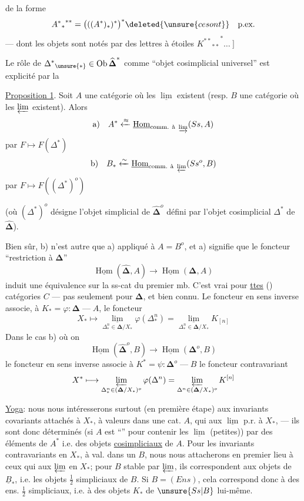 de la forme
\[
 {{A^*}_*}^{**}=\bigl(( (A^*)_* )^*\bigr)^*
 \deleted{\unsure{ce sont}}\quad\text{p.ex.}
\]
--- dont les objets sont notés par des lettres à étoiles
$ {{K^{**}}_{**}}^*\ldots\ \Big]$

Le rôle de ${\Delta^*}_{\unsure{*}}\in\operatorname{Ob}\widehat{\boldsymbol\Delta}^{*}$
comme ``objet cosimplicial universel'' est explicité par la

\uline{Proposition 1}. Soit $A$ une catégorie où les $\underline{\lim}$ existent
(resp. $B$ une catégorie où les $\varprojlim$ existent). Alors
\[
 \text{a)}\quad A^*\xleftarrow{\approx}
 \underline{\operatorname{Hom}}_{\text{comm. à }\varinjlim}(Ss,A)
\]
par $F\longmapsto F(\Delta^*)$
\[
 \text{b)}\quad B_*\xleftarrow{\sim}
 \underline{\operatorname{Hom}}_{\text{comm. à }\varprojlim}(Ss^o,B)
\]
par $F\longmapsto F((\Delta^*)^o)$

(où $(\Delta^*)^o$ désigne l'objet simplicial de $\widehat{\boldsymbol\Delta}^{o}$
défini par l'objet cosimplicial $\Delta^*$ de $\widehat{\boldsymbol\Delta}$).

Bien sûr, b) n'est autre que a) appliqué à $A=B^o$, et a) signifie que
le foncteur ``restriction à $\boldsymbol\Delta$''
\[
 \underline{\operatorname{Hom}}(\widehat{\boldsymbol\Delta},A)
 \longrightarrow\underline{\operatorname{Hom}}(\boldsymbol\Delta,A)
\]
induit une équivalence sur la ss-cat
du premier mb. C'est vrai pour \uline{ttes}
() catégories $C$ ---
pas seulement pour $\boldsymbol\Delta$, et bien connu.
Le foncteur en sens inverse associe, à
$K_*=\varphi:\boldsymbol\Delta\mathbin{\text{---}}A$, le foncteur
\[
 X_*\longmapsto
 \underset{\Delta^n_*\in\boldsymbol\Delta/X_*}{\underline{\lim}}
 \varphi(\Delta^n_*)=
 \underset{\Delta^n_*\in\boldsymbol\Delta/X_*}{\underline{\lim}}K_{[n]}
\]
Dans le cas b) où on 
\[
 \underline{\operatorname{Hom}}(\widehat{\boldsymbol\Delta}^{o},B)
 \longrightarrow\underline{\operatorname{Hom}}(\boldsymbol\Delta^{o},B)
\]
le foncteur en sens inverse associe à
$K^*=\psi:\boldsymbol\Delta^o\mathbin{\text{---}}B$
le foncteur contravariant
\[
 X^*\longmapsto
 \varprojlim_{\Delta^n_*\in(\boldsymbol\Delta/X_*)^o}\varphi(\Delta^n)
 =\varprojlim_{\Delta^n\in(\boldsymbol\Delta/X_*)^o}K^{[n]}
\]

\uline{Yoga}: nous nous intéresserons surtout
 (en première étape) aux invariants covariants attachés à $X_*$,
à valeurs dans une cat. $A$, qui 
aux $\underline{\lim}$ p.r. à $X_*$, --- ils sont donc déterminés
(si $A$ est ``\uline{}'' pour contenir les $\underline{\lim}$
(petites)) par des éléments de $A^*$ i.e. des objets \uline{cosimpliciaux} de $A$.
Pour les invariants contravariants en $X_*$, à val. dans un $B$, nous nous
attacherons en premier lieu à ceux qui  aux $\varprojlim$
en $X_*$; pour $B$ stable par $\varprojlim$, ils correspondent
 aux objets de $\underline B_*$, i.e. les objets
$\tfrac12$ simpliciaux de $B$. Si $B=(Ens)$, cela correspond donc à des
ens. $\tfrac12$ simpliciaux, i.e. à des objets $K_*$ de
$\unsure{Ss|B}$ lui-même.
